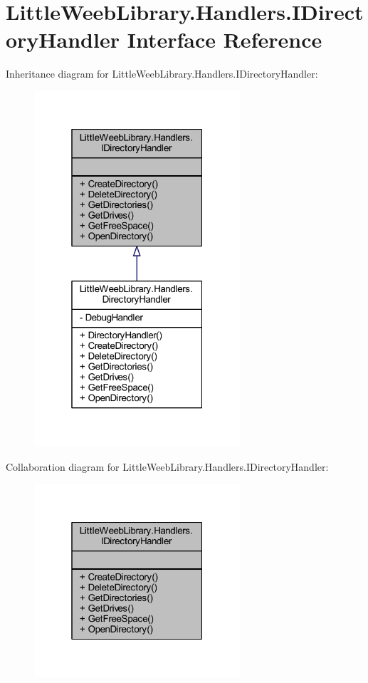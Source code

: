 \hypertarget{interface_little_weeb_library_1_1_handlers_1_1_i_directory_handler}{}\section{Little\+Weeb\+Library.\+Handlers.\+I\+Directory\+Handler Interface Reference}
\label{interface_little_weeb_library_1_1_handlers_1_1_i_directory_handler}


Inheritance diagram for Little\+Weeb\+Library.\+Handlers.\+I\+Directory\+Handler\+:\nopagebreak
\begin{figure}[H]
\begin{center}
\leavevmode
\includegraphics[width=217pt]{interface_little_weeb_library_1_1_handlers_1_1_i_directory_handler__inherit__graph}
\end{center}
\end{figure}


Collaboration diagram for Little\+Weeb\+Library.\+Handlers.\+I\+Directory\+Handler\+:\nopagebreak
\begin{figure}[H]
\begin{center}
\leavevmode
\includegraphics[width=217pt]{interface_little_weeb_library_1_1_handlers_1_1_i_directory_handler__coll__graph}
\end{center}
\end{figure}
